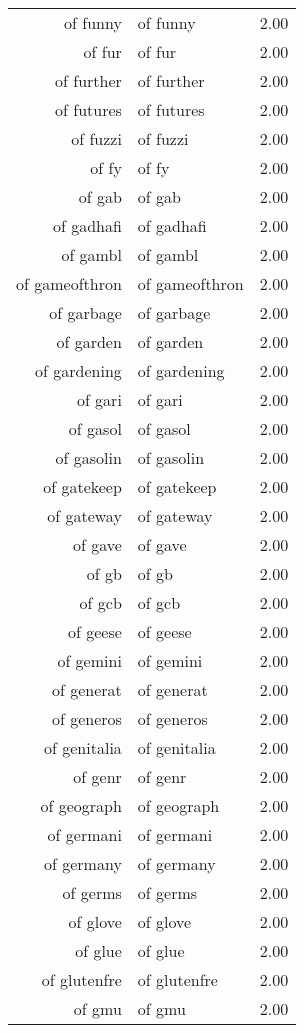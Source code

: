 \begin{table}[ht]
\begin{tabular}{rlr}
  of funny & of funny & 2.00 \\ 
  of fur & of fur & 2.00 \\ 
  of further & of further & 2.00 \\ 
  of futures & of futures & 2.00 \\ 
  of fuzzi & of fuzzi & 2.00 \\ 
  of fy & of fy & 2.00 \\ 
  of gab & of gab & 2.00 \\ 
  of gadhafi & of gadhafi & 2.00 \\ 
  of gambl & of gambl & 2.00 \\ 
  of gameofthron & of gameofthron & 2.00 \\ 
  of garbage & of garbage & 2.00 \\ 
  of garden & of garden & 2.00 \\ 
  of gardening & of gardening & 2.00 \\ 
  of gari & of gari & 2.00 \\ 
  of gasol & of gasol & 2.00 \\ 
  of gasolin & of gasolin & 2.00 \\ 
  of gatekeep & of gatekeep & 2.00 \\ 
  of gateway & of gateway & 2.00 \\ 
  of gave & of gave & 2.00 \\ 
  of gb & of gb & 2.00 \\ 
  of gcb & of gcb & 2.00 \\ 
  of geese & of geese & 2.00 \\ 
  of gemini & of gemini & 2.00 \\ 
  of generat & of generat & 2.00 \\ 
  of generos & of generos & 2.00 \\ 
  of genitalia & of genitalia & 2.00 \\ 
  of genr & of genr & 2.00 \\ 
  of geograph & of geograph & 2.00 \\ 
  of germani & of germani & 2.00 \\ 
  of germany & of germany & 2.00 \\ 
  of germs & of germs & 2.00 \\ 
  of glove & of glove & 2.00 \\ 
  of glue & of glue & 2.00 \\ 
  of glutenfre & of glutenfre & 2.00 \\ 
  of gmu & of gmu & 2.00 \\ 

\end{tabular}
\end{table}
